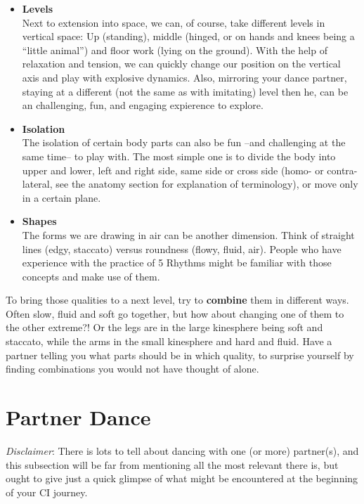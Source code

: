 \begin{itemize}
    \item [] \textbf{Levels} \\
    Next to extension into space, we can, of course, take different levels in vertical space: Up (standing), middle (hinged, or on hands and knees being a ``little animal'') and floor work (lying on the ground).
    With the help of relaxation and tension, we can quickly change our position on the vertical axis and play with explosive dynamics.
    Also, mirroring your dance partner, staying at a different (not the same as with imitating) level then he, can be an challenging, fun, and engaging expierence to explore.

    \item [] \textbf{Isolation} \\
    The isolation of certain body parts can also be fun --and challenging at the same time-- to play with.
    The most simple one is to divide the body into upper and lower, left and right side, same side or cross side (homo- or contra-lateral, see the anatomy section for explanation of terminology), or move only in a certain plane.

    \item [] \textbf{Shapes} \\
    The forms we are drawing in air can be another dimension.
    Think of straight lines (edgy, staccato) versus roundness (flowy, fluid, air).
    People who have experience with the practice of 5 Rhythms might be familiar with those concepts and make use of them.
\end{itemize}

To bring those qualities to a next level, try to \textbf{combine} them in different ways.
Often slow, fluid and soft go together, but how about changing one of them to the other extreme?!
Or the legs are in the large kinesphere being soft and staccato, while the arms in the small kinesphere and hard and fluid.
Have a partner telling you what parts should be in which quality, to surprise yourself by finding combinations you would not have thought of alone.

\section{Partner Dance}\label{sec:partner-dance}

\textit{Disclaimer}: There is lots to tell about dancing with one (or more) partner(s), and this subsection will be far from mentioning all the most relevant there is, but ought to give just a quick glimpse of what might be encountered at the beginning of your CI journey.

